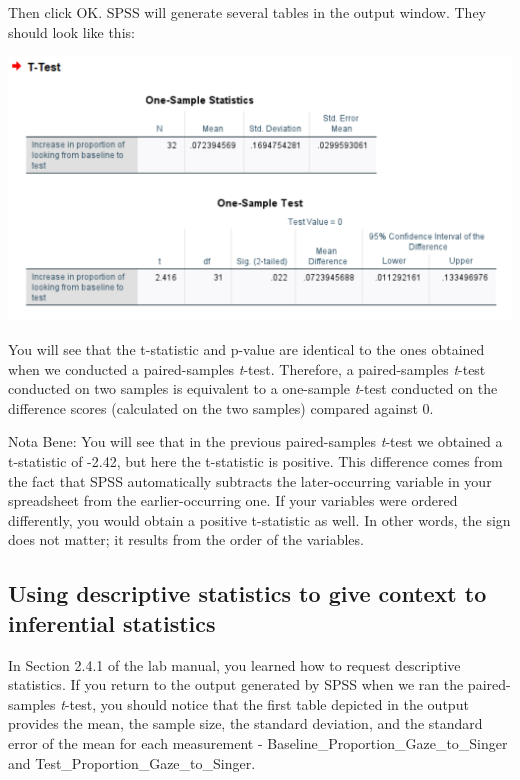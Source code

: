 \documentclass[
]{book}
\begin{document}
Then click {OK}. SPSS will generate several tables in the output window. They should look like this:

\includegraphics{img/6.4.33.png}

You will see that the t-statistic and p-value are identical to the ones obtained when we conducted a paired-samples \emph{t}-test. Therefore, a paired-samples \emph{t}-test conducted on two samples is equivalent to a one-sample \emph{t}-test conducted on the difference scores (calculated on the two samples) compared against 0.

Nota Bene: You will see that in the previous paired-samples \emph{t}-test we obtained a t-statistic of -2.42, but here the t-statistic is positive. This difference comes from the fact that SPSS automatically subtracts the later-occurring variable in your spreadsheet from the earlier-occurring one. If your variables were ordered differently, you would obtain a positive t-statistic as well. In other words, the sign does not matter; it results from the order of the variables.

\hypertarget{using-descriptive-statistics-to-give-context-to-inferential-statistics}{%
\subsection{Using descriptive statistics to give context to inferential statistics}\label{using-descriptive-statistics-to-give-context-to-inferential-statistics}}

In Section 2.4.1 of the lab manual, you learned how to request descriptive statistics. If you return to the output generated by SPSS when we ran the paired-samples \emph{t}-test, you should notice that the first table depicted in the output provides the mean, the sample size, the standard deviation, and the standard error of the mean for each measurement - Baseline\_Proportion\_Gaze\_to\_Singer and Test\_Proportion\_Gaze\_to\_Singer.
\end{document}
